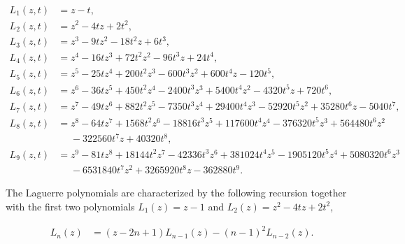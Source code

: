     \begin{align*}
        L_1(z,t) &= z - t, \\
        L_2(z,t) &= z^2 - 4tz + 2t^2,\\
        L_3(z,t) &= z^3 - 9tz^2 - 18t^2z + 6t^3, \\
        L_4(z,t) &= z^4 - 16tz^3 + 72t^2z^2 - 96t^3z + 24t^4,\\
        L_5(z,t) &= z^5 - 25tz^4 + 200t^2z^3 - 600t^3z^2 + 600t^4z - 120t^5,\\
        L_6(z,t) &= z^6 - 36tz^5 + 450t^2z^4 - 2400t^3z^3 + 5400t^4z^2 - 4320t^5z + 720t^6, \\
        L_7(z,t) &= z^7 - 49tz^6 + 882t^2z^5 -7350t^3z^4 + 29400t^4z^3 - 52920t^5z^2 + 35280t^6z - 5040t^7,\\
        L_8(z,t) &= z^8 - 64tz^7 + 1568t^2z^6 - 18816t^3z^5 + 117600t^4z^4 - 376320t^5z^3 + 564480t^6z^2\\ &\phantom{=}- 322560t^7z + 40320t^8,\\
        L_9(z,t) &= z^{9}-81tz^{8}+18144t^2z^{7}-42336t^3z^{6}+381024t^4z^{5}-1905120t^5z^{4}+5080320t^6z^{3}\\ 
        &\phantom{=}-6531840t^7z^{2} +3265920t^8z-362880t^9.
    \end{align*}

    The Laguerre polynomials are characterized by the following recursion together with the first two polynomials $L_1(z)=z-1$ and $L_2(z)=z^2-4tz + 2t^2$,

    \begin{align*}
        L_n(z) &= (z-2n+1)L_{n-1}(z) - (n-1)^2L_{n-2}(z).
    \end{align*}


